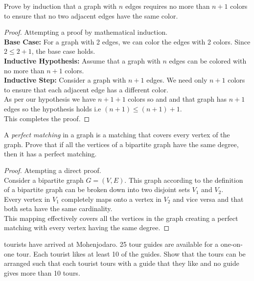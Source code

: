 \documentclass[a4paper]{exam}
\begin{document}
\begin{questions}
  \question Prove by induction that a graph with $n$ edges requires no more than $n+1$ colors to ensure that no two adjacent edges have the same color.
  \begin{solution}
    \renewcommand\qedsymbol{$\square$}
    \begin{proof}
      Attempting a proof by mathematical induction. \\
      \textbf{Base Case:} For a graph with 2 edges, we can color the edges with 2 colors. Since $2 \leq 2+1$, the base case holds. \\
      \textbf{Inductive Hypothesis:} Assume that a graph with $n$ edges can be colored with no more than $n+1$ colors. \\
      \textbf{Inductive Step:} Consider a graph with $n+1$ edges. We need only $n+1$ colors to ensure that each adjacent edge has a different color. \\
      As per our hypothesis we have $n+1+1$ colors so and and that graph has $n+1$ edges so the hypothesis holds i.e $(n+1) \leq (n+1)+1$. \\
      This completes the proof.
    \end{proof}
  \end{solution}
  
  \question A \textit{perfect matching} in a graph is a matching that covers every vertex of the graph. Prove that if all the vertices of a bipartite graph have the same degree, then it has a perfect matching.
  \begin{solution}
    \renewcommand\qedsymbol{$\square$}
    \begin{proof}
      Atempting a direct proof. \\
      Consider a bipartite graph $G = (V,E)$. This graph according to the definition of a bipartite graph can be broken down into two disjoint sets $V_1$ and $V_2$. \\
      Every vertex in $V_1$ completely maps onto a vertex in $V_2$ and vice versa and that both seta have the same cardinality. \\
      This mapping effectively covers all the vertices in the graph creating a perfect matching with every vertex having the same degree.
    \end{proof}
  \end{solution}

   tourists have arrived at Mohenjodaro. 25 tour guides are available for a one-on-one tour. Each tourist likes at least 10 of the guides. Show that the tours can be arranged such that each tourist tours with a guide that they like and no guide gives more than 10 tours.


\end{questions}
\end{document}
